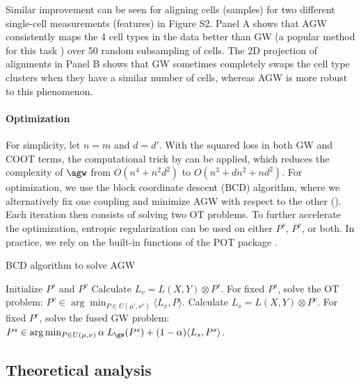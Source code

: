 Similar improvement can be seen for aligning cells (samples) for two different single-cell
measurements (features) \citep{SNAREseq} in Figure S2. Panel A shows that AGW consistently maps
the 4 cell types in the data better than GW (a popular method for this task
\citep{Pamona,Demetci20,Demetci22,UniPort}) over 50 random subsampling of cells.
The 2D projection of alignments in Panel B shows that GW sometimes completely swaps
the cell type clusters when they have a similar number of cells, whereas AGW is more robust
to this phenomenon.

\paragraph{Optimization} For simplicity, let $n = m$ and $d = d'$.
With the squared loss in both GW and COOT terms, the computational trick by \citep{Peyre16}
can be applied, which reduces the complexity of $\agw$ from $O(n^4 + n^2 d^2)$
to $O(n^3 + dn^2 + nd^2)$. For optimization, we use the block coordinate descent (BCD) algorithm,
where we alternatively fix one coupling and minimize AGW with respect to the other ().
Each iteration then consists of solving two OT problems. To further accelerate the optimization,
entropic regularization can be used \citep{Cuturi13} on either $P^s$, $P^v$, or both.
In practice, we rely on the built-in functions of the POT package \citep{Flamary21}.

\begin{algorithm}[!t]
    \caption{BCD algorithm to solve AGW \label{alg:bcd}}
    \begin{algorithmic}[t]
      \STATE Initialize $P^s$ and $P^v$
      \REPEAT
      \STATE Calculate $L_v = L(X, Y) \otimes P^s$.
      \STATE For fixed $P^s$, solve the OT problem:
      $P^v \in \arg\min_{P \in U(\mu', \nu')} \langle L_v, P \rangle$.
      \STATE Calculate $L_s = L(X, Y) \otimes P^v$.
      \STATE For fixed $P^v$, solve the fused GW problem:
      $P^s \in \arg\min_{P \in U(\mu, \nu)} \alpha \; L_{\gw} (P^s)
      + (1-\alpha) \langle L_s, P^s \rangle$.
\end{algorithmic}
\end{algorithm}

\subsection{Theoretical analysis}

